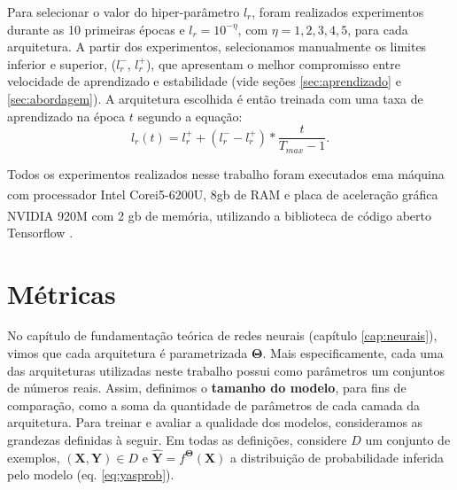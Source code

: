Para selecionar o valor do hiper-parâmetro $l_r$, foram realizados experimentos durante as 10 primeiras épocas e $l_r=10^{-\eta}$, com $\eta=1, 2, 3, 4, 5$, para cada arquitetura. A partir dos experimentos, selecionamos manualmente os limites inferior e superior, ($l_r^-$, $l_r^+$), que apresentam o melhor compromisso entre velocidade de aprendizado e estabilidade (vide seções \ref{sec:aprendizado} e \ref{sec:abordagem}). A arquitetura escolhida é então treinada com uma taxa de aprendizado na época $t$ segundo a equação:
\begin{equation}
l_r(t) = l_r^+ + (l_r^- - l_r^+) * \frac{t}{T_{max}-1}.
\end{equation}

Todos os experimentos realizados nesse trabalho foram executados ema máquina com processador Intel\textsuperscript{\textregistered} Core\texttrademark i5-6200U, 8gb de RAM e placa de aceleração gráfica NVIDIA\textsuperscript{\textregistered} 920M com 2 gb de memória, utilizando a biblioteca de código aberto Tensorflow \cite{abadi2016tensorflow}.

\section{Métricas}

No capítulo de fundamentação teórica de redes neurais (capítulo \ref{cap:neurais}), vimos que cada arquitetura é parametrizada $\mathbf{\Theta}$. Mais especificamente, cada uma das arquiteturas utilizadas neste trabalho possui como parâmetros um conjuntos de números reais. Assim, definimos o \textbf{tamanho do modelo}, para fins de comparação, como a soma da quantidade de parâmetros de cada camada da arquitetura. Para treinar e avaliar a qualidade dos modelos, consideramos as grandezas definidas à seguir. Em todas as definições, considere $D$ um conjunto de exemplos, $(\mathbf{X}, \mathbf{Y}) \in D$ e $\hat{\mathbf{Y}} = f^{\mathbf{\Theta}}(\mathbf{X})$ a distribuição de probabilidade inferida pelo modelo (eq. \ref{eq:yasprob}). 

